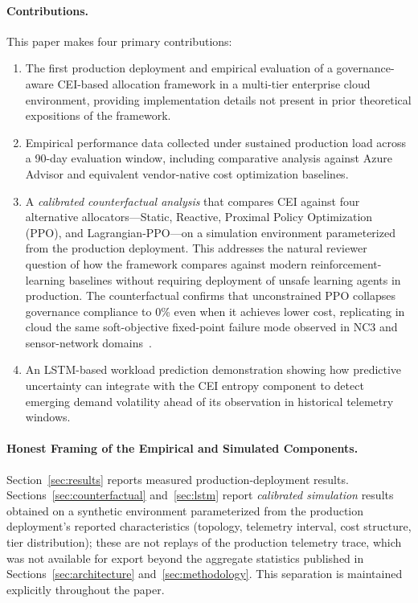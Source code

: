 \documentclass[runningheads]{llncs}
\begin{document}
\paragraph{Contributions.} This paper makes four primary contributions:
\begin{enumerate}
\item The first production deployment and empirical evaluation of a governance-aware CEI-based allocation framework in a multi-tier enterprise cloud environment, providing implementation details not present in prior theoretical expositions of the framework.
\item Empirical performance data collected under sustained production load across a 90-day evaluation window, including comparative analysis against Azure Advisor and equivalent vendor-native cost optimization baselines.
\item A \emph{calibrated counterfactual analysis} that compares CEI against four alternative allocators---Static, Reactive, Proximal Policy Optimization (PPO), and Lagrangian-PPO---on a simulation environment parameterized from the production deployment. This addresses the natural reviewer question of how the framework compares against modern reinforcement-learning baselines without requiring deployment of unsafe learning agents in production. The counterfactual confirms that unconstrained PPO collapses governance compliance to 0\% even when it achieves lower cost, replicating in cloud the same soft-objective fixed-point failure mode observed in NC3 and sensor-network domains~\cite{paper1,paper2}.
\item An LSTM-based workload prediction demonstration showing how predictive uncertainty can integrate with the CEI entropy component to detect emerging demand volatility ahead of its observation in historical telemetry windows.
\end{enumerate}

\paragraph{Honest Framing of the Empirical and Simulated Components.} Section~\ref{sec:results} reports measured production-deployment results. Sections~\ref{sec:counterfactual} and~\ref{sec:lstm} report \emph{calibrated simulation} results obtained on a synthetic environment parameterized from the production deployment's reported characteristics (topology, telemetry interval, cost structure, tier distribution); these are not replays of the production telemetry trace, which was not available for export beyond the aggregate statistics published in Sections~\ref{sec:architecture} and~\ref{sec:methodology}. This separation is maintained explicitly throughout the paper.
\end{document}
